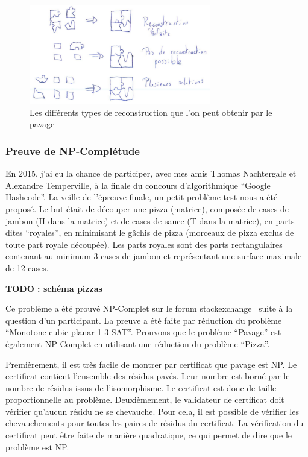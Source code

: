 \begin{figure}
  \includegraphics[width=300px]{Figures/s2m/pavage/reconstructions.png}
  \caption{\label{reconstruction}Les différents types de reconstruction que l'on peut obtenir par le pavage}
\end{figure}


\subsubsection{Preuve de NP-Complétude}

En 2015, j'ai eu la chance de participer, avec mes amis Thomas Nachtergale et Alexandre Temperville, à la finale du concours d'algorithmique ``Google Hashcode''.
La veille de l'épreuve finale, un petit problème test nous a été proposé.
Le but était de découper une pizza (matrice), composée de cases de jambon (H dans la matrice) et de cases de sauce (T dans la matrice), en parts dites ``royales'', en minimisant le gâchis de pizza (morceaux de pizza exclus de toute part royale découpée).
Les parts royales sont des parts rectangulaires contenant au minimum 3 cases de jambon et représentant une surface maximale de 12 cases.

\textbf{TODO : schéma pizzas}

Ce problème a été prouvé NP-Complet sur le forum stackexchange~\cite{de_biasi_complexity_2015} suite à la question d'un participant.
La preuve a été faite par réduction du problème ``Monotone cubic planar 1-3 SAT''.
Prouvons que le problème ``Pavage'' est également NP-Complet en utilisant une réduction du problème ``Pizza''.

Premièrement, il est très facile de montrer par certificat que pavage est NP.
Le certificat contient l'ensemble des résidus pavés.
Leur nombre est borné par le nombre de résidus issus de l'isomorphisme.
Le certificat est donc de taille proportionnelle au problème.
Deuxièmement, le validateur de certificat doit vérifier qu'aucun résidu ne se chevauche.
Pour cela, il est possible de vérifier les chevauchements pour toutes les paires de résidus du certificat.
La vérification du certificat peut être faite de manière quadratique, ce qui permet de dire que le problème est NP.

